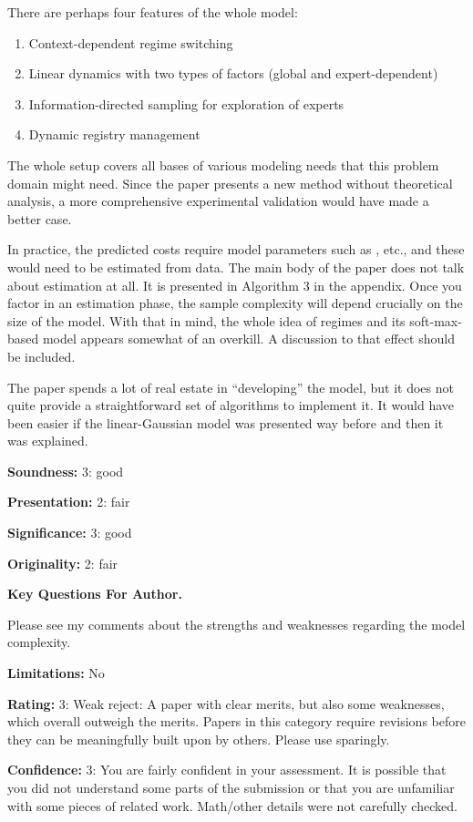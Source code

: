There are perhaps four features of the whole model:
\begin{enumerate}
    \item Context-dependent regime switching
    \item Linear dynamics with two types of factors (global and expert-dependent)
    \item Information-directed sampling for exploration of experts
    \item Dynamic registry management
\end{enumerate}

The whole setup covers all bases of various modeling needs that this problem domain might need. Since the paper presents a new method without theoretical analysis, a more comprehensive experimental validation would have made a better case.

In practice, the predicted costs require model parameters such as , etc., and these would need to be estimated from data. The main body of the paper does not talk about estimation at all. It is presented in Algorithm 3 in the appendix. Once you factor in an estimation phase, the sample complexity will depend crucially on the size of the model. With that in mind, the whole idea of regimes and its soft-max-based model appears somewhat of an overkill. A discussion to that effect should be included.

The paper spends a lot of real estate in ``developing'' the model, but it does not quite provide a straightforward set of algorithms to implement it. It would have been easier if the linear-Gaussian model was presented way before and then it was explained.

\textbf{Soundness:} 3: good

\textbf{Presentation:} 2: fair

\textbf{Significance:} 3: good

\textbf{Originality:} 2: fair

\textbf{Key Questions For Author.}

Please see my comments about the strengths and weaknesses regarding the model complexity.

\textbf{Limitations:} No

\textbf{Rating:} 3: Weak reject: A paper with clear merits, but also some weaknesses, which overall outweigh the merits. Papers in this category require revisions before they can be meaningfully built upon by others. Please use sparingly.

\textbf{Confidence:} 3: You are fairly confident in your assessment. It is possible that you did not understand some parts of the submission or that you are unfamiliar with some pieces of related work. Math/other details were not carefully checked.


